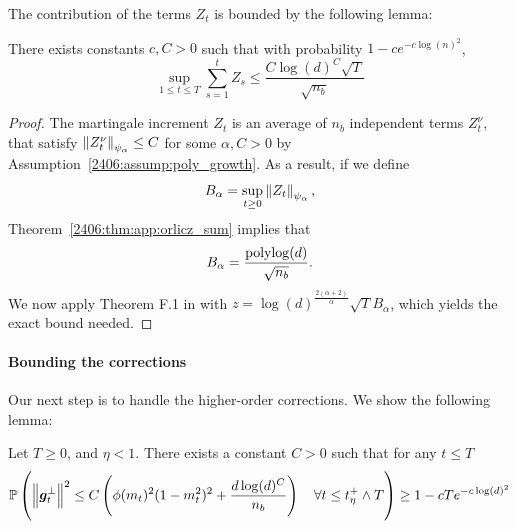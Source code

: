 The contribution of the terms $Z_t$ is bounded by the following lemma:
\begin{lemma}\label{2406:lem:app:bound_martingale}
    There exists constants $c, C > 0$ such that with probability $1-ce^{-c\log(n)^2}$,
    \begin{equation}
        \sup_{1 \leq t \leq T} \sum_{s = 1}^t Z_s  \leq \frac{C\log(d)^C \sqrt{T}}{\sqrt{n_b}}
    \end{equation}
\end{lemma}
\begin{proof}
     The martingale increment $Z_t$ is an average of $n_b$ independent terms $Z_t^\nu$, that satisfy $\left\lVert Z_t^\nu\right\rVert_{\psi_\alpha} \leq C$ for some $\alpha, C > 0$ by Assumption~\ref{2406:assump:poly_growth}. As a result, if we define
     \begin{equation*}
         B_\alpha = \sup_{t \geq 0} \left\lVert Z_t\right\rVert_{\psi_\alpha},
     \end{equation*}
     Theorem~\ref{2406:thm:app:orlicz_sum} implies that
    \begin{equation*}
        B_\alpha = \frac{\operatorname{polylog}(d)}{\sqrt{n_b}}.
    \end{equation*}
 We now apply Theorem F.1 in \cite{li2021stochastic} with $z = \log(d)^{\frac{2(\alpha+2)}{\alpha}}  \sqrt{T} B_\alpha$, which yields the exact bound needed. 
\end{proof}

\paragraph{Bounding the corrections} Our next step is to handle the higher-order corrections. We show the following lemma:
\begin{lemma}\label{2406:lem:app:bound_corrections}
    Let $T \geq 0$, and $\eta < 1$. There exists a constant $C > 0$ such that for any $t \leq T$
    \begin{equation}
        \mathbb{P}\left(\left\lVert {\boldsymbol{g}}_t^\bot\right\rVert^2 \leq C\left(\phi(m_t)^2(1 - m_t^2)^2  + \frac {d\log(d)^C} {n_b}\right) \quad \forall t \leq t_\eta^+ \wedge T \right) \geq 1 - cTe^{-c\log(d)^2}
    \end{equation}
\end{lemma}


